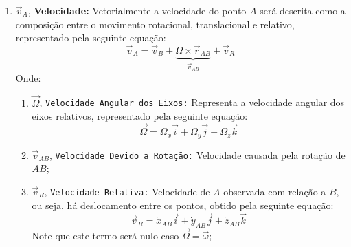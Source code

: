 \documentclass{article}
\begin{document}
\begin{enumerate}[rightmargin = \leftmargin, noitemsep]
                    \item $\vec{v}_{A}$, \textbf{Velocidade:} Vetorialmente a velocidade do ponto $A$ será descrita como a composição entre o movimento rotacional,  translacional e relativo, representado pela seguinte equação:
                        \begin{equation}
                            \boxed{
                                \vec{v}_{A} = 
                                \vec{v}_{B} + 
                                \underbrace{
                                    \Omega\times\vec{r}_{AB}
                                }_{\vec{v}_{AB}} + 
                                \vec{v}_{R}
                            }
                        \end{equation}
                    Onde:
                        \begin{enumerate}[rightmargin = \leftmargin, noitemsep]
                            \item $\vec{\Omega}$, \texttt{Velocidade Angular dos Eixos:} Representa a velocidade angular dos eixos relativos, representado pela seguinte equação:
                                \begin{equation}
                                    \boxed{
                                        \vec{\Omega} = 
                                        \Omega_{x}\vec{i} + 
                                        \Omega_{y}\vec{j} + 
                                        \Omega_{z}\vec{k}
                                    }
                                \end{equation}


                            \item $\vec{v}_{AB}$, \texttt{Velocidade Devido a Rotação:} Velocidade causada pela rotação de $AB$;

                            \item $\vec{v}_{R}$, \texttt{Velocidade Relativa:} Velocidade de $A$ observada com relação a $B$, ou seja, há deslocamento entre os pontos, obtido pela seguinte equação:
                                \begin{equation*}
                                    \vec{v}_{R} = 
                                    \dot{x}_{AB}\vec{i} + 
                                    \dot{y}_{AB}\vec{j} + 
                                    \dot{z}_{AB}\vec{k}
                                \end{equation*}
                            Note que este termo será nulo caso $\vec{\Omega} = \vec{\omega}$;
                        \end{enumerate}


\end{enumerate}
\end{document}
